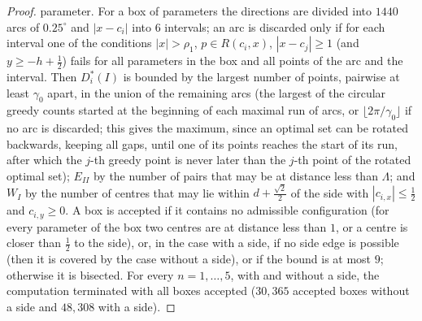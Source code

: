 \documentclass[11pt]{amsart}
\theoremstyle{definition}
\theoremstyle{remark}
\begin{document}
\begin{proof}
parameter. For a box of parameters the directions are divided into $1440$ arcs of $0.25^\circ$ and $|x-c_i|$ into $6$ intervals; an arc
is discarded only if for each interval one of the conditions $|x|>\rho_1$, $p\in R(c_i,x)$, $|x-c_j|\ge1$ (and $y\ge-h+\frac12$) fails for all
parameters in the box and all points of the arc and the interval. Then $D_i^*(I)$ is bounded by the largest number of points,
pairwise at least $\gamma_0$ apart, in the union of the remaining arcs (the largest of the circular greedy counts started at the beginning of each maximal run of
arcs, or $\lfloor2\pi/\gamma_0\rfloor$ if no arc is discarded; this gives the maximum, since an optimal set can be rotated backwards, keeping all gaps, until one of its points reaches
the start of its run, after which the $j$-th greedy point is never later than the $j$-th point of the rotated optimal set); $E_{II}$ by the number of pairs that may be at distance less
than $\Lambda$; and $W_I$ by the number of centres that may lie within $d+\frac{\sqrt2}2$ of the side with $|c_{i,x}|\le\frac12$ and $c_{i,y}\ge0$.
A box is accepted if it contains no admissible configuration (for every parameter of the box two centres are at distance less
than $1$, or a centre is closer than $\frac12$ to the side), or, in the case with a side, if no side edge is possible (then it is covered by the case without a side), or
if the bound is at most $9$; otherwise it is bisected. For every $n=1,\dots,5$, with and without a side, the computation
terminated with all boxes accepted ($30{,}365$ accepted boxes without a side and $48{,}308$ with a side).


\end{proof}
\end{document}
